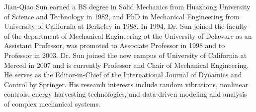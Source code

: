 \begin{biography}{Jian-Qiao Sun}
earned a BS degree in Solid Mechanics from Huazhong University of Science and Technology in 1982, and PhD in Mechanical Engineering from University of California at Berkeley in 1988.  In 1994, Dr. Sun joined the faculty of the department of Mechanical Engineering at the University of Delaware as an Assistant Professor, was promoted to Associate Professor in 1998 and to Professor in 2003.  Dr. Sun joined the new campus of University of California at Merced in 2007 and is currently Professor and Chair of Mechanical Engineering. He serves as the Editor-in-Chief of the International Journal of Dynamics and Control by Springer.  His research interests include random vibrations, nonlinear controls, energy harvesting technologies, and data-driven modeling and analysis of complex mechanical systems.
\end{biography}


